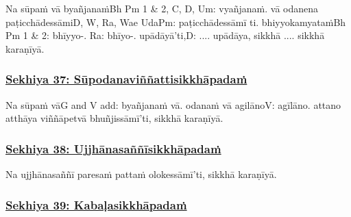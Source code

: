Na sūpaṁ vā byañjanaṁ\makeatletter\hyperlink{endnote-appendix}\makeatother Bh Pm 1 & 2, C, D, Um: vyañjanaṁ. vā odanena paṭicchādessāmi\makeatletter\hyperlink{endnote-appendix}\makeatother D, W, Ra, Wae UdaPm: paṭicchādessāmī ti. bhiyyokamyataṁ\makeatletter\hyperlink{endnote-appendix}\makeatother Bh Pm 1 & 2: bhīyyo-. Ra: bhīyo-. upādāyā'ti,\makeatletter\hyperlink{endnote-appendix}\makeatother D: .... upādāya, sikkhā ....  sikkhā karaṇīyā.



\subsubsection*{\hyperref[training37]{Sekhiya 37: Sūpodanaviññattisikkhāpadaṁ}}
\label{sekh37}

Na sūpaṁ vā\makeatletter\hyperlink{endnote-appendix}\makeatother G and V add: byañjanaṁ vā. odanaṁ vā agilāno\makeatletter\hyperlink{endnote-appendix}\makeatother V: agīlāno. attano atthāya viññāpetvā bhuñjissāmī'ti, sikkhā karaṇīyā.



\subsubsection*{\hyperref[training38]{Sekhiya 38: Ujjhānasaññīsikkhāpadaṁ}}
\label{sekh38}

Na ujjhānasaññī paresaṁ pattaṁ olokessāmī'ti, sikkhā karaṇīyā.



\subsubsection*{\hyperref[training39]{Sekhiya 39: Kabaḷasikkhāpadaṁ}}
\label{sekh39}

